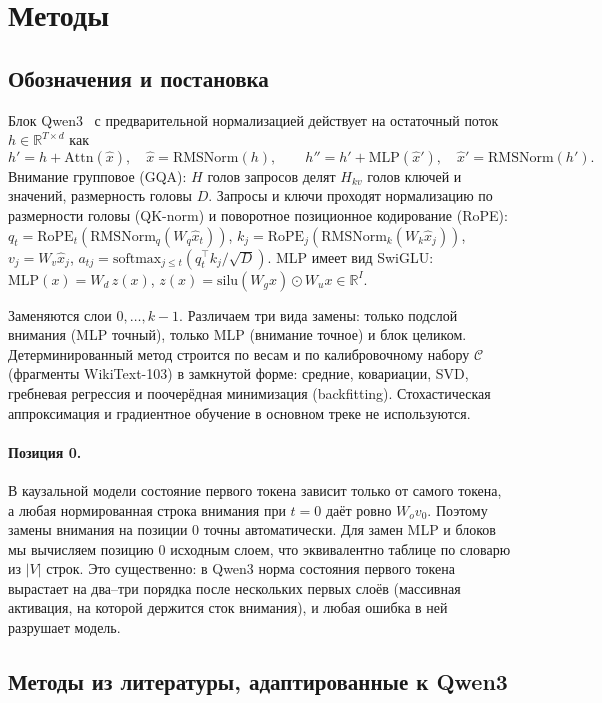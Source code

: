 \section{Методы}\label{sec:methods}

\subsection{Обозначения и постановка}

Блок Qwen3~\cite{vaswani2017attention} с предварительной нормализацией
действует на остаточный поток $h\in\mathbb{R}^{T\times d}$ как
\[
  h' = h + \mathrm{Attn}(\hat x),\quad \hat x=\mathrm{RMSNorm}(h),\qquad
  h'' = h' + \mathrm{MLP}(\hat x'),\quad \hat x'=\mathrm{RMSNorm}(h').
\]
Внимание групповое (GQA): $H$ голов запросов делят $H_{kv}$ голов
ключей и значений, размерность головы $D$. Запросы и ключи проходят
нормализацию по размерности головы (QK-norm) и поворотное
позиционное кодирование (RoPE):
$q_t=\mathrm{RoPE}_t(\mathrm{RMSNorm}_q(W_q\hat x_t))$,
$k_j=\mathrm{RoPE}_j(\mathrm{RMSNorm}_k(W_k\hat x_j))$, $v_j=W_v\hat x_j$,
$a_{tj}=\mathrm{softmax}_{j\le t}(q_t^\top k_j/\sqrt D)$.
MLP имеет вид SwiGLU: $\mathrm{MLP}(x)=W_d\,z(x)$,
$z(x)=\mathrm{silu}(W_g x)\odot W_u x\in\mathbb{R}^{I}$.

Заменяются слои $0,\dots,k-1$. Различаем три вида замены: только
подслой внимания (MLP точный), только MLP (внимание точное) и блок
целиком. Детерминированный метод строится по весам и по
калибровочному набору $\mathcal C$ (фрагменты WikiText-103) в замкнутой
форме: средние, ковариации, SVD, гребневая регрессия и
поочерёдная минимизация (backfitting). Стохастическая аппроксимация
и градиентное обучение в основном треке не используются.

\paragraph{Позиция 0.} В каузальной модели состояние первого токена
зависит только от самого токена, а любая нормированная строка внимания
при $t=0$ даёт ровно $W_o v_0$. Поэтому замены внимания на позиции $0$
точны автоматически. Для замен MLP и блоков мы вычисляем позицию $0$
исходным слоем, что эквивалентно таблице по словарю из $|V|$ строк.
Это существенно: в Qwen3 норма состояния первого токена вырастает на
два–три порядка после нескольких первых слоёв (массивная активация,
на которой держится сток внимания), и любая ошибка в ней разрушает
модель.

\subsection{Методы из литературы, адаптированные к Qwen3}

